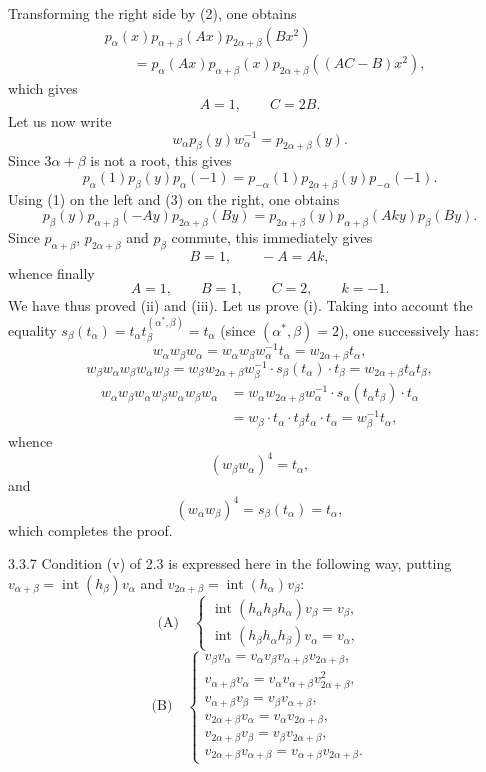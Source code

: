 Transforming the right side by (2), one obtains
\[
\begin{aligned}
&p_\alpha(x)p_{\alpha+\beta}(Ax)p_{2\alpha+\beta}(Bx^2)\\
&\qquad=p_\alpha(Ax)p_{\alpha+\beta}(x)p_{2\alpha+\beta}((AC-B)x^2),
\end{aligned}
\]
which gives
\[
A=1,\qquad C=2B.
\]
Let us now write
\[
w_\alpha p_\beta(y)w_\alpha^{-1}=p_{2\alpha+\beta}(y).
\]
Since $3\alpha+\beta$ is not a root, this gives
\[
p_\alpha(1)p_\beta(y)p_\alpha(-1)=p_{-\alpha}(1)p_{2\alpha+\beta}(y)p_{-\alpha}(-1).
\]
Using (1) on the left and (3) on the right, one obtains
\[
p_\beta(y)p_{\alpha+\beta}(-Ay)p_{2\alpha+\beta}(By)=p_{2\alpha+\beta}(y)p_{\alpha+\beta}(Aky)p_\beta(By).
\]
Since $p_{\alpha+\beta}$, $p_{2\alpha+\beta}$ and $p_\beta$ commute, this immediately gives
\[
B=1,\qquad -A=Ak,
\]
whence finally
\[
A=1,\qquad B=1,\qquad C=2,\qquad k=-1.
\]
We have thus proved (ii) and (iii). Let us prove (i). Taking into account the equality $s_\beta(t_\alpha)=t_\alpha t_\beta^{(\alpha^*,\beta)}=t_\alpha$ (since $(\alpha^*,\beta)=2$), one successively has:
\[
w_\alpha w_\beta w_\alpha=w_\alpha w_\beta w_\alpha^{-1}t_\alpha=w_{2\alpha+\beta}t_\alpha,
\]
\[
w_\beta w_\alpha w_\beta w_\alpha w_\beta
=w_\beta w_{2\alpha+\beta}w_\beta^{-1}\cdot s_\beta(t_\alpha)\cdot t_\beta
=w_{2\alpha+\beta}t_\alpha t_\beta,
\]
\[
\begin{aligned}
w_\alpha w_\beta w_\alpha w_\beta w_\alpha w_\beta w_\alpha
&=w_\alpha w_{2\alpha+\beta}w_\alpha^{-1}\cdot s_\alpha(t_\alpha t_\beta)\cdot t_\alpha\\
&=w_\beta\cdot t_\alpha\cdot t_\beta t_\alpha\cdot t_\alpha=w_\beta^{-1}t_\alpha,
\end{aligned}
\]
whence
\[
(w_\beta w_\alpha)^4=t_\alpha,
\]
and
\[
(w_\alpha w_\beta)^4=s_\beta(t_\alpha)=t_\alpha,
\]
which completes the proof.
\begin{remark}{3.3.7}\label{XXIII.3.3.7}
Condition (v) of 2.3 is expressed here in the following way, putting $v_{\alpha+\beta}=\operatorname{int}(h_\beta)v_\alpha$ and $v_{2\alpha+\beta}=\operatorname{int}(h_\alpha)v_\beta$:
\[
\text{(A)}\quad\begin{cases}
\operatorname{int}(h_\alpha h_\beta h_\alpha)v_\beta=v_\beta,\\
\operatorname{int}(h_\beta h_\alpha h_\beta)v_\alpha=v_\alpha,
\end{cases}
\]
\[
\text{(B)}\quad\begin{cases}
v_\beta v_\alpha=v_\alpha v_\beta v_{\alpha+\beta}v_{2\alpha+\beta},\\
v_{\alpha+\beta}v_\alpha=v_\alpha v_{\alpha+\beta}v_{2\alpha+\beta}^2,\\
v_{\alpha+\beta}v_\beta=v_\beta v_{\alpha+\beta},\\
v_{2\alpha+\beta}v_\alpha=v_\alpha v_{2\alpha+\beta},\\
v_{2\alpha+\beta}v_\beta=v_\beta v_{2\alpha+\beta},\\
v_{2\alpha+\beta}v_{\alpha+\beta}=v_{\alpha+\beta}v_{2\alpha+\beta}.
\end{cases}
\]
\end{remark}

